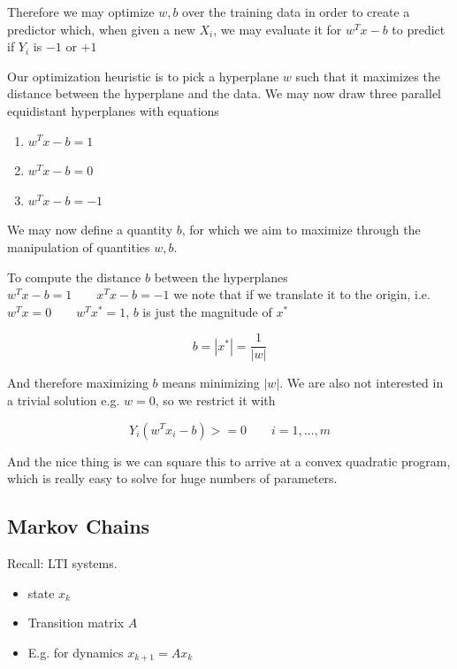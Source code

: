 \documentclass[10pt]{article}
\begin{document}
Therefore we may optimize $ w, b $ over the training data in order to create a predictor which, when given a new $ X_i $, we may evaluate it for $ w^Tx-b $ to predict if $ Y_i $ is $ -1 $  or $ +1 $ 


Our optimization heuristic is to pick a hyperplane $ w $ such that it maximizes the distance between the hyperplane and the data.
We may now draw three parallel equidistant hyperplanes with equations

\begin{enumerate}
	\item $w^Tx - b =1 $ 
	\item $w^Tx - b =0 $ 
	\item $w^Tx - b =-1 $ 
\end{enumerate}

We may now define a quantity $ b $, for which we aim to maximize through the manipulation of quantities  $ w, b $.

To compute the distance $ b $ between the hyperplanes $ w^Tx-b=1 \qquad x^Tx-b=-1$ we note that if we translate it to the origin, i.e. $ w^Tx = 0 \qquad w^Tx^* = 1 $, $ b $ is just the magnitude of $ x^* $



\begin{equation}
	b = |x^*| = \frac{1}{|w|} 
\end{equation}

And therefore maximizing $ b $ means minimizing $ |w| $.
We are also not interested in a trivial solution e.g. $ w = 0$, so we restrict it with 

\begin{equation}
	Y_i(w^Tx_i - b) >= 0 \qquad i = 1, \ldots, m
\end{equation}

And the nice thing is we can square this to arrive at a convex quadratic program, which is really easy to solve for huge numbers of parameters.

\subsection{Markov Chains}

Recall: LTI systems. 

\begin{itemize}
	\item state $ x_k $ 
	\item Transition matrix $ A $ 
	\item E.g. for dynamics $ x_{k+1} = Ax_{k} $ 
\end{itemize}
\end{document}
